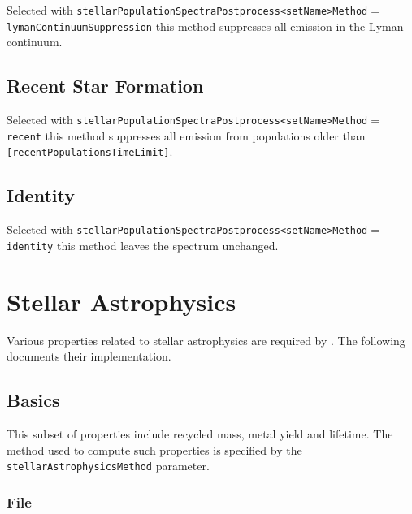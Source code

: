 Selected with {\tt stellarPopulationSpectraPostprocess\textless setName\textgreater Method}$=${\tt lymanContinuumSuppression} this method suppresses all emission in the Lyman continuum.

\subsection{Recent Star Formation}

Selected with {\tt stellarPopulationSpectraPostprocess\textless setName\textgreater Method}$=${\tt recent} this method suppresses all emission from populations older than {\tt [recentPopulationsTimeLimit]}.

\subsection{Identity}

Selected with {\tt stellarPopulationSpectraPostprocess\textless setName\textgreater Method}$=${\tt identity} this method leaves the spectrum unchanged.

\section{Stellar Astrophysics}

Various properties related to stellar astrophysics are required by \glc. The following documents their implementation.

\subsection{Basics}

This subset of properties include recycled mass, metal yield and lifetime.  The method used to compute such properties is specified by the {\tt stellarAstrophysicsMethod} parameter.

\subsubsection{File}\label{sec:StellarAstrophysicsFile}

